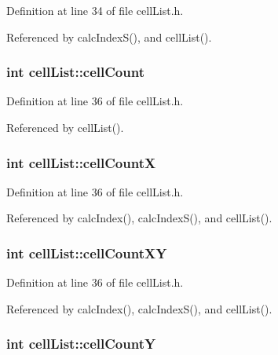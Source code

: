 Definition at line 34 of file cell\-List.\-h.



Referenced by calc\-Index\-S(), and cell\-List().

\hypertarget{classcell_list_a6a695015c180229cd491db58c6e18ff4}{
\subsubsection[{cell\-Count}]{\setlength{\rightskip}{0pt plus 5cm}int cell\-List\-::cell\-Count}}\label{classcell_list_a6a695015c180229cd491db58c6e18ff4}


Definition at line 36 of file cell\-List.\-h.



Referenced by cell\-List().

\hypertarget{classcell_list_a342f802c342f51f3c1aa4dab7d7a4d84}{
\subsubsection[{cell\-Count\-X}]{\setlength{\rightskip}{0pt plus 5cm}int cell\-List\-::cell\-Count\-X}}\label{classcell_list_a342f802c342f51f3c1aa4dab7d7a4d84}


Definition at line 36 of file cell\-List.\-h.



Referenced by calc\-Index(), calc\-Index\-S(), and cell\-List().

\hypertarget{classcell_list_a619d607f8569876cead1bdfad239d4b2}{
\subsubsection[{cell\-Count\-X\-Y}]{\setlength{\rightskip}{0pt plus 5cm}int cell\-List\-::cell\-Count\-X\-Y}}\label{classcell_list_a619d607f8569876cead1bdfad239d4b2}


Definition at line 36 of file cell\-List.\-h.



Referenced by calc\-Index(), calc\-Index\-S(), and cell\-List().

\hypertarget{classcell_list_aa0c942e7b0b61cda1d688ffc96e8f1c8}{
\subsubsection[{cell\-Count\-Y}]{\setlength{\rightskip}{0pt plus 5cm}int cell\-List\-::cell\-Count\-Y}}\label{classcell_list_aa0c942e7b0b61cda1d688ffc96e8f1c8}



